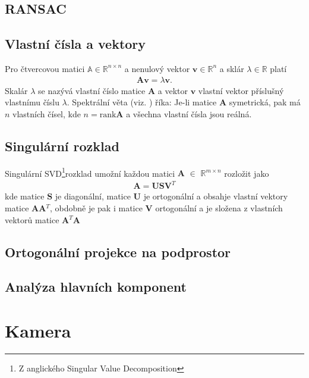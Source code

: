 \documentclass[twoside]{ctuthesis}
\newcommand{\spc}[2]{$\mathbb{#1}^{#2}$}
\newcommand{\minsp}[3]{$\mathbb{#1} \in \mathbb{#2}^{#3}$}
\newcommand{\tl}[1]{$\mathbf{#1}$}
\begin{document}
\section{RANSAC}
\label{sec:ransac}

\section{Vlastní čísla a vektory}
Pro čtvercovou matici \minsp{A}{R}{n\times n} a nenulový vektor \tl{v}\minsp{}{R}{n} a sklár $\lambda \in \mathbb{R}$ platí
\begin{align}
    \mathbf{Av} = \lambda \mathbf{v}.
\end{align}
Skalár $\lambda$ se nazývá vlastní číslo matice \tl{A} a vektor \tl{v} vlastní vektor příslušný vlastnímu číslu $\lambda$.
Spektrální věta (viz. \cite{Werner2020}) říka: Je-li matice \tl{A} symetrická, pak má $n$ vlastních čísel, kde $n = \text{rank}\mathbf{A}$ a všechna vlastní čísla jsou reálná.


\section{Singulární rozklad}
Singulární SVD\footnote{Z anglického Singular Value Decomposition}rozklad umožní každou matici \tl{A} $\in$ \spc{R}{m \times n} rozložit jako
\begin{align}
    \mathbf{A} = \mathbf{USV}^T
\end{align}
kde matice \tl{S} je diagonální, matice \tl{U} je ortogonální a obsahje vlastní vektory matice \tl{AA}$^T$, obdobně je pak i matice \tl{V} ortogonální a je složena z vlastních vektorů matice \tl{A}$^T$\tl{A}

\section{Ortogonální projekce na podprostor}
\label{sec:projekce}

\section{Analýza hlavních komponent}


\chapter{Kamera}
\end{document}
